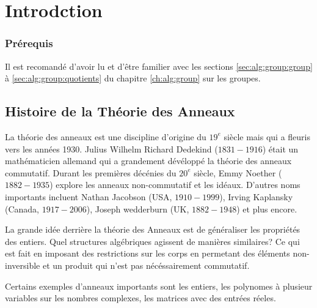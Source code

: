 \section{Introdction}
\label{sec:alg:ring:intro}

\subsubsection{Prérequis}
Il est recomandé d'avoir lu et d'être familier avec les sections \ref{sec:alg:group:group} à \ref{sec:alg:group:quotients} du chapitre \ref{ch:alg:group} sur les groupes.

\subsection{Histoire de la Théorie des Anneaux}
La théorie des anneaux est une discipline d'origine du $19^e$ siècle mais qui a fleuris vers les années 1930. Julius Wilhelm Richard Dedekind ($1831-1916$) était un mathématicien allemand qui a grandement dévéloppé la théorie des anneaux commutatif. Durant les premières décénies du $20^e$ siècle, Emmy Noether ($1882-1935$) explore les anneaux non-commutatif et les idéaux. D'autres noms importants incluent Nathan Jacobson (USA, $1910-1999$), Irving Kaplansky (Canada, $1917-2006$), Joseph wedderburn (UK, $1882-1948$) et plus encore.

La grande idée derrière la théorie des Anneaux est de généraliser les propriétés des entiers. Quel structures algébriques agissent de manières similaires? Ce qui est fait en imposant des restrictions sur les corps en permetant des éléments non-inversible et un produit qui n'est pas nécéssairement commutatif.

Certains exemples d'anneaux importants sont les entiers, les polynomes à plusieur variables sur les nombres complexes, les matrices avec des entrées réeles.

